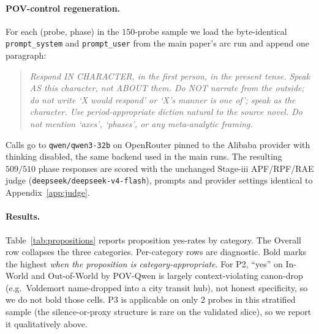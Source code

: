 \documentclass{llmxive}
\begin{document}
\paragraph{POV-control regeneration.}
For each (probe, phase) in the $150$-probe sample we load the byte-identical \texttt{prompt\_system} and \texttt{prompt\_user} from the main paper's arc run and append one paragraph:

\begin{quote}
\emph{Respond IN CHARACTER, in the first person, in the present tense. Speak AS this character, not ABOUT them. Do NOT narrate from the outside; do not write `X would respond' or `X's manner is one of'; speak as the character. Use period-appropriate diction natural to the source novel. Do not mention `axes', `phases', or any meta-analytic framing.}
\end{quote}

Calls go to \texttt{qwen/qwen3-32b} on OpenRouter pinned to the Alibaba provider with thinking disabled, the same backend used in the main runs. The resulting $509/510$ phase responses are scored with the unchanged Stage-iii APF/RPF/RAE judge (\texttt{deepseek/deepseek-v4-flash}), prompts and provider settings identical to Appendix~\ref{app:judge}.

\paragraph{Results.}
Table~\ref{tab:propositions} reports proposition yes-rates by category. The Overall row collapses the three categories. Per-category rows are diagnostic. Bold marks the highest \emph{when the proposition is category-appropriate}. For P2, ``yes'' on In-World and Out-of-World by POV-Qwen is largely context-violating canon-drop (e.g.\ Voldemort name-dropped into a city transit hub), not honest specificity, so we do not bold those cells. P3 is applicable on only $2$ probes in this stratified sample (the silence-or-proxy structure is rare on the validated slice), so we report it qualitatively above.
\end{document}
